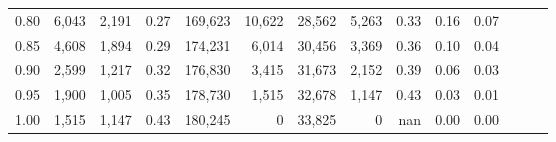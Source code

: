 \begin{tabular}{rrrrrrrrrrrrrr}
0.80 &   6,043 &  2,191 &  0.27 &  169,623 &   10,622 &  28,562 &   5,263 &  0.33 &  0.16 &      0.07 \\
0.85 &   4,608 &  1,894 &  0.29 &  174,231 &    6,014 &  30,456 &   3,369 &  0.36 &  0.10 &      0.04 \\
0.90 &   2,599 &  1,217 &  0.32 &  176,830 &    3,415 &  31,673 &   2,152 &  0.39 &  0.06 &      0.03 \\
0.95 &   1,900 &  1,005 &  0.35 &  178,730 &    1,515 &  32,678 &   1,147 &  0.43 &  0.03 &      0.01 \\
1.00 &   1,515 &  1,147 &  0.43 &  180,245 &        0 &  33,825 &       0 &   nan &  0.00 &      0.00 \\
\bottomrule
\end{tabular}
